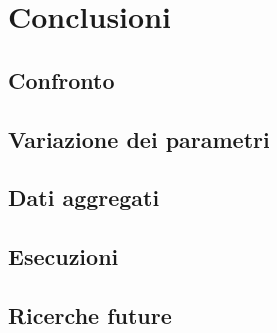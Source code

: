 \documentclass[a4paper]{article}
\begin{document}
\section{Conclusioni}

\subsection{Confronto}

\subsection{Variazione dei parametri}

\subsection{Dati aggregati}

\subsection{Esecuzioni}

\subsection{Ricerche future}
  
\end{document}
